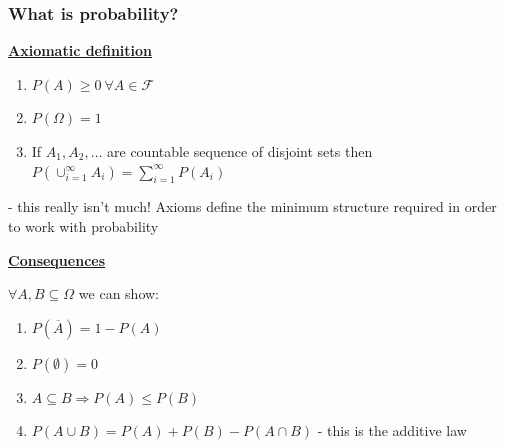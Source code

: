 \documentclass[t,8pt]{beamer}%
\begin{document}
	\begin{frame}
		\frametitle{What is probability?}
		{\bf\underline{Axiomatic definition}} \par
		\vspace{5pt}
		\begin{enumerate}
			\item $P(A)\geq 0\ \forall A\in\mathcal F$
			\item $P(\Omega)=1$
			\item If $A_1,A_2,\dots$ are countable sequence of disjoint sets then $P(\cup_{i=1}^{\infty}A_i)=\sum_{i=1}^{\infty}P(A_i)$
		\end{enumerate}
		{\small\color{NavyBlue} - this really isn't much! Axioms define the minimum structure required in order to work with probability} \par
		{\bf\underline{Consequences}} \par
		\vspace{5pt}
		$\forall A,B\subseteq\Omega$ we can show:
		\begin{enumerate}
			\item $P(\overline A)=1-P(A)$
			\item $P(\emptyset)=0$
			\item $A\subseteq B\Rightarrow P(A)\leq P(B)$
			\item $P(A\cup B)=P(A)+P(B)-P(A\cap B)$ - this is the additive law
		\end{enumerate}
	\end{frame}
	
\end{document}
